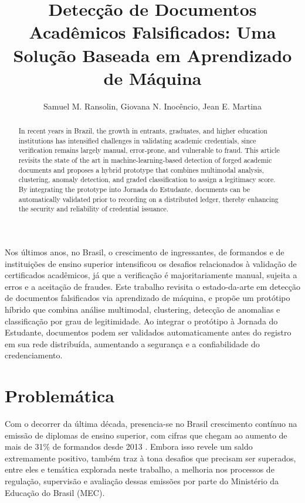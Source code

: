\documentclass[12pt]{article}
\title{Detecção de Documentos Acadêmicos Falsificados: Uma Solução Baseada em Aprendizado de Máquina}
\author{Samuel M. Ransolin\inst{1}, Giovana N. Inocêncio\inst{1}, Jean E. Martina\inst{1} }
\begin{document}
 

\maketitle

\begin{abstract}
  In recent years in Brazil, the growth in entrants, graduates, and higher education institutions has intensified challenges in validating academic credentials, since verification remains largely manual, error-prone, and vulnerable to fraud. 
  This article revisits the state of the art in machine-learning-based detection of forged academic documents and proposes a hybrid prototype that combines multimodal analysis, clustering, anomaly detection, and graded classification to assign a legitimacy score. 
  By integrating the prototype into Jornada do Estudante, documents can be automatically validated prior to recording on a distributed ledger, thereby enhancing the security and reliability of credential issuance.
\end{abstract}
     
\begin{resumo} 
  Nos últimos anos, no Brasil, o crescimento de ingressantes, de formandos e de instituições de ensino superior intensificou os desafios relacionados à validação de certificados acadêmicos, já que a verificação é majoritariamente manual, sujeita a erros e a aceitação de fraudes.
  Este trabalho revisita o estado-da-arte em detecção de documentos falsificados via aprendizado de máquina, e propõe um protótipo híbrido que combina análise multimodal, clustering, detecção de anomalias e classificação por grau de legitimidade.
  Ao integrar o protótipo à Jornada do Estudante, documentos podem ser validados automaticamente antes do registro em sua rede distribuída, aumentando a segurança e a confiabilidade do credenciamento.
\end{resumo}


\section{Problemática}

Com o decorrer da última década, presencia-se no Brasil crescimento contínuo na emissão de diplomas de ensino superior, com cifras que chegam ao aumento de mais de 31\% de formandos desde 2013 \cite{inep:2023}. Embora isso revele um saldo extremamente positivo, também traz à tona desafios que precisam ser superados, entre eles e temática explorada neste trabalho, a melhoria nos processos de regulação, supervisão e avaliação dessas emissões por parte do Ministério da Educação do Brasil (MEC).
\end{document}
